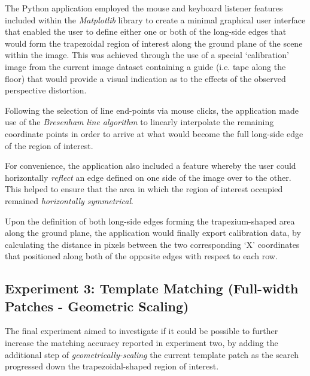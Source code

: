 The Python application employed the mouse and keyboard listener features included within the \textit{Matplotlib} library \cite{matplotlib} to create a minimal graphical user interface that enabled the user to define either one or both of the long-side edges that would form the trapezoidal region of interest along the ground plane of the scene within the image. This was achieved through the use of a special `calibration' image from the current image dataset containing a guide (i.e. tape along the floor) that would provide a visual indication as to the effects of the observed perspective distortion. 

Following the selection of line end-points via mouse clicks, the application made use of the \textit{Bresenham line algorithm} \cite{bresenham} to linearly interpolate the remaining coordinate points in order to arrive at what would become the full long-side edge of the region of interest. 

For convenience, the application also included a feature whereby the user could horizontally \textit{reflect} an edge defined on one side of the image over to the other. This helped to ensure that the area in which the region of interest occupied remained \textit{horizontally symmetrical}.

Upon the definition of both long-side edges forming the trapezium-shaped area along the ground plane, the application would finally export calibration data, by calculating the distance in pixels between the two corresponding `X' coordinates that positioned along both of the opposite edges with respect to each row.

\subsection{Experiment 3: Template Matching (Full-width Patches - Geometric Scaling)}
\label{tm-scaled}

The final experiment aimed to investigate if it could be possible to further increase the matching accuracy reported in experiment two, by adding the additional step of \textit{geometrically-scaling} the current template patch as the search progressed down the trapezoidal-shaped region of interest.

